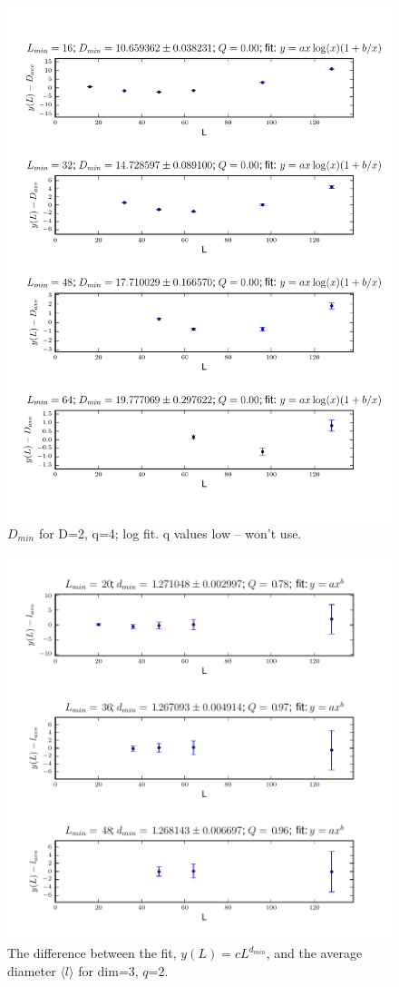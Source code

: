 \documentclass[pre,preprint]{revtex4}
\newcommand{\lb}{{\langle}}
\newcommand{\rb}{{\rangle}}
\begin{document}
\begin{figure}[htp]
\centering
\includegraphics[width=.9\textwidth]{figures/D_min_D2q4_46_log_fig}
\caption{$D_{min}$ for D=2, q=4; log fit. q values low -- won't use.}\label{fig:4}
\end{figure}



\begin{figure}[htp]
\centering
\includegraphics[width=.9\textwidth]{figures/d_min_D3q2_46_fig}
\caption{The difference between the fit, $y(L)=cL^{d_{min}}$, and the average diameter $\lb l \rb$ for dim=3, $q$=2.}\label{fig:4}
\end{figure}
\end{document}
